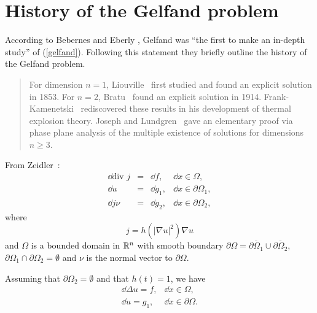 %
%
\section{History of the Gelfand problem}
%
%

According to Bebernes and Eberly \cite[p.46]{bebernes:mpc89},
Gelfand was ``the first to make an in-depth
study'' of (\ref{gelfand}). Following this statement they briefly
outline the history of the Gelfand problem.
\par
\begin{quote}
For dimension $n=1$, Liouville~\cite{liouville:edp53} first studied and
found an explicit solution in 1853. For $n=2$, Bratu~\cite{bratu:ein14}
found an explicit solution in 1914.  Frank-Kamenetski~\cite{frank:dhe55}
rediscovered these results in his development of thermal explosion
theory.  Joseph and Lundgren~\cite{joseph:qdp73} gave an elementary
proof via phase plane analysis of the multiple existence of solutions
for dimensions $n\geq 3$.
\end{quote}
\par


From Zeidler~\cite{zeidler:nfa88IIa}:
{\samepage
\begin{equation}\label{station}
\begin{array}{rcll}
\dd\mbox{div } j& = &\dd f, &\dd x\in\Omega ,\\[8pt]
\dd u& = & \dd g_1, & \dd x\in\partial\Omega_1 , \\[8pt]
\dd j\nu & = & \dd g_2, & \dd x\in\partial\Omega_2 ,
\end{array}
\end{equation} }
where
\begin{equation}\label{current}
j =  h(|\nabla u|^2)\nabla u
\end{equation}
and $\Omega$ is a bounded domain in ${\Bbb R}^n$ with
smooth boundary $\partial\Omega = \overline{\partial\Omega_1}\cup
\overline{\partial\Omega_2}$, $\partial\Omega_1 \cap
\partial\Omega_2 = \emptyset$ and $\nu$ is the normal vector to
$\partial\Omega$.

\begin{lemma}
Assuming that $\partial\Omega_2 = \emptyset$ and that $h(t) = 1$, we
have $$
\begin{array}{lr}
\dd\Delta u = f, & \dd x\in\Omega ,\\[8pt]
\dd u =  g_1, & \dd x\in\partial\Omega .
\end{array}
$$
\end{lemma}

